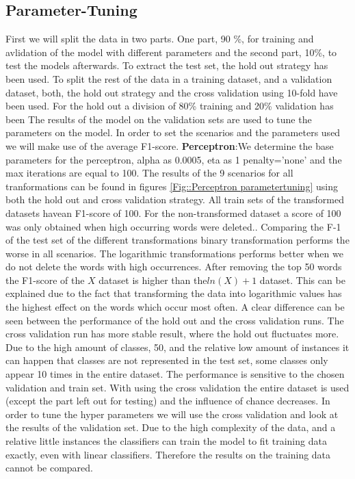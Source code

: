 \documentclass[11pt]{article}
\begin{document}
\subsection{Parameter-Tuning}
First we will split the data in two parts. One part, 90 \%, for training and avlidation of the model with different parameters and the second part, 10\%, to test the models afterwards. To extract the test set, the hold out strategy has been used.
\newline
To split the rest of the data in a training dataset, and a validation dataset, both, the hold out strategy and the cross validation using 10-fold have been used. For the hold out a division of 80\% training and 20\% validation has been 
The results of the model on the validation sets are used to tune the parameters on the model.
\newline
In order to set the scenarios and the parameters used we will make use of the average F1-score. 
%
\newline
\textbf{Perceptron}:We determine the base parameters for the perceptron, alpha as 0.0005, eta as 1 penalty='none' and the max iterations are equal to 100. The results of the 9 scenarios for all tranformations can be found in figures  \ref{Fig::Perceptron parametertuning} using both the hold out and cross validation strategy.
All train sets of the transformed datasets havean F1-score of 100. For the non-transformed dataset a score of 100 was only obtained when high occurring words were deleted.. 
\newline
Comparing the F-1 of the test set of the different transformations binary transformation performs the worse in all scenarios. The logarithmic transformations performs better when we do not delete the words with high occurrences. After removing the top 50 words the F1-score of the $X$ dataset is higher than the$ln(X)+1$ dataset. This can be explained due to the fact that transforming the data into logarithmic values has the highest effect on the words which occur most often.
\newline
A clear difference can be seen between the performance of the hold out and the cross validation runs. The cross validation run has more stable result, where the hold out fluctuates more. Due to the high amount of classes, 50, and the relative low amount of instances it can happen that classes are not represented in the test set, some classes only appear 10 times in the entire dataset. The performance is sensitive to the chosen validation and train set. With using the cross validation the entire dataset is used (except the part left out for testing) and the influence of chance decreases. In order to tune the hyper parameters we will use the cross validation and look at the results of the validation set. Due to the high complexity of the data, and a relative little instances the classifiers can train the model to fit training data exactly, even with linear classifiers. Therefore the results on the training data cannot be compared. 
\end{document}
